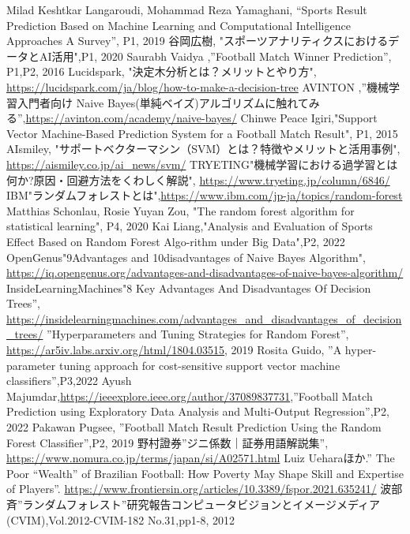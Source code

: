 \documentclass[platex]{suribt}
\begin{document}
\begin{thebibliography}{2}%
\bibitem{}
Milad Keshtkar Langaroudi, Mohammad Reza Yamaghani, “Sports Result Prediction Based on Machine Learning and Computational Intelligence Approaches A Survey”, P1, 2019
\bibitem{}
谷岡広樹, "スポーツアナリティクスにおけるデータとAI活用",P1, 2020
\bibitem{}
Saurabh Vaidya ,”Football Match Winner Prediction”, P1,P2, 2016
\bibitem{}
Lucidspark, "決定木分析とは？メリットとやり方", \url{https://lucidspark.com/ja/blog/how-to-make-a-decision-tree}
\bibitem{}
AVINTON ,”機械学習入門者向け Naive Bayes(単純ベイズ)アルゴリズムに触れてみる”,\url{https://avinton.com/academy/naive-bayes/}
\bibitem{}
Chinwe Peace Igiri,"Support Vector Machine-Based Prediction System for a Football Match Result", P1, 2015
\bibitem{}
AIsmiley, "サポートベクターマシン（SVM）とは？特徴やメリットと活用事例", \url{https://aismiley.co.jp/ai_news/svm/}
\bibitem{}
TRYETING"機械学習における過学習とは何か?原因・回避方法をくわしく解説", \url{https://www.tryeting.jp/column/6846/}
\bibitem{}
IBM"ランダムフォレストとは",\url{https://www.ibm.com/jp-ja/topics/random-forest}
\bibitem{}
Matthias Schonlau, Rosie Yuyan Zou, "The random forest algorithm for statistical learning", P4, 2020
\bibitem{}
Kai Liang,"Analysis and Evaluation of Sports Effect Based on Random Forest Algo-rithm under Big Data",P2, 2022
\bibitem{}
OpenGenus"9Advantages and 10disadvantages of Naive Bayes Algorithm", \url{https://iq.opengenus.org/advantages-and-disadvantages-of-naive-bayes-algorithm/}
\bibitem{}
InsideLearningMachines"8 Key Advantages And Disadvantages Of Decision Trees”, \url{https://insidelearningmachines.com/advantages_and_disadvantages_of_decision_trees/}
\bibitem{}
”Hyperparameters and Tuning Strategies for Random Forest”, \url{https://ar5iv.labs.arxiv.org/html/1804.03515}, 2019
\bibitem{}
Rosita Guido, ”A hyper-parameter tuning approach for cost-sensitive support vector machine classifiers”,P3,2022
\bibitem{}
Ayush Majumdar,\url{https://ieeexplore.ieee.org/author/37089837731},”Football Match Prediction using Exploratory Data Analysis and Multi-Output Regression”,P2, 2022
\bibitem{}
Pakawan Pugsee, ”Football Match Result Prediction Using the Random Forest Classifier”,P2, 2019
\bibitem{}
野村證券”ジニ係数｜証券用語解説集”, \url{https://www.nomura.co.jp/terms/japan/si/A02571.html}
\bibitem{}
Luiz Ueharaほか.” The Poor “Wealth” of Brazilian Football: How Poverty May Shape Skill and Expertise of Players”. \url{https://www.frontiersin.org/articles/10.3389/fspor.2021.635241/}
\bibitem{}
波部斉”ランダムフォレスト”研究報告コンピュータビジョンとイメージメディア(CVIM),Vol.2012-CVIM-182 No.31,pp1-8, 2012

\end{thebibliography}
\end{document}
